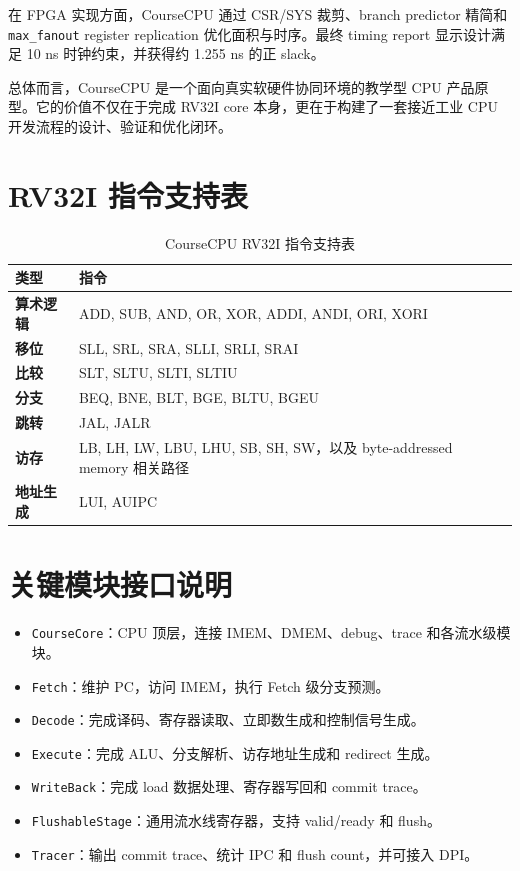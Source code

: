 \documentclass[UTF8,a4paper,12pt]{ctexrep}
\begin{document}
在 FPGA 实现方面，CourseCPU 通过 CSR/SYS 裁剪、branch predictor 精简和 \texttt{max\_fanout} register replication 优化面积与时序。最终 timing report 显示设计满足 10 ns 时钟约束，并获得约 1.255 ns 的正 slack。

总体而言，CourseCPU 是一个面向真实软硬件协同环境的教学型 CPU 产品原型。它的价值不仅在于完成 RV32I core 本身，更在于构建了一套接近工业 CPU 开发流程的设计、验证和优化闭环。

\appendix

\chapter{RV32I 指令支持表}

\begin{longtable}{>{\bfseries}l p{}}
  \caption{CourseCPU RV32I 指令支持表}\\
  \toprule
  类型 & 指令 \\
  \midrule
  算术逻辑 & ADD, SUB, AND, OR, XOR, ADDI, ANDI, ORI, XORI \\
  移位 & SLL, SRL, SRA, SLLI, SRLI, SRAI \\
  比较 & SLT, SLTU, SLTI, SLTIU \\
  分支 & BEQ, BNE, BLT, BGE, BLTU, BGEU \\
  跳转 & JAL, JALR \\
  访存 & LB, LH, LW, LBU, LHU, SB, SH, SW，以及 byte-addressed memory 相关路径 \\
  地址生成 & LUI, AUIPC \\
  \bottomrule
\end{longtable}

\chapter{关键模块接口说明}

\begin{itemize}
  \item \texttt{CourseCore}：CPU 顶层，连接 IMEM、DMEM、debug、trace 和各流水级模块。
  \item \texttt{Fetch}：维护 PC，访问 IMEM，执行 Fetch 级分支预测。
  \item \texttt{Decode}：完成译码、寄存器读取、立即数生成和控制信号生成。
  \item \texttt{Execute}：完成 ALU、分支解析、访存地址生成和 redirect 生成。
  \item \texttt{WriteBack}：完成 load 数据处理、寄存器写回和 commit trace。
  \item \texttt{FlushableStage}：通用流水线寄存器，支持 valid/ready 和 flush。
  \item \texttt{Tracer}：输出 commit trace、统计 IPC 和 flush count，并可接入 DPI。
\end{itemize}
\end{document}
